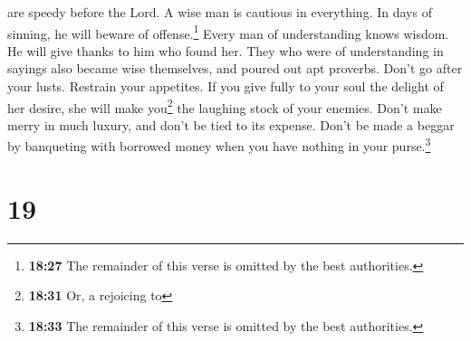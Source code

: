 are speedy before the Lord.  A wise man is cautious in
everything. In days of sinning, he will beware of offense.\footnote{\textbf{18:27}
  The remainder of this verse is omitted by the best authorities.}
 Every man of understanding knows wisdom. He will give
thanks to him who found her.  They who were of
understanding in sayings also became wise themselves, and poured out apt
proverbs.  Don't go after your lusts. Restrain your
appetites.  If you give fully to your soul the delight of
her desire, she will make you\footnote{\textbf{18:31} Or, a rejoicing to}
the laughing stock of your enemies.  Don't make merry in
much luxury, and don't be tied to its expense.  Don't be
made a beggar by banqueting with borrowed money when you have nothing in
your purse.\footnote{\textbf{18:33} The remainder of this verse is
  omitted by the best authorities.}

\hypertarget{section-15}{%
\section{19}\label{section-15}}

